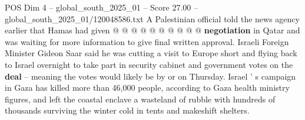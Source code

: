 \begin{textsample}{POS Dim 4 – global\_south\_2025\_01 – Score 27.00 – global\_south\_2025\_01/120048586.txt}
A Palestinian official told the news agency earlier that Hamas had given @ @ @ @ @ @ @ @ @ @ \textbf{negotiation} in Qatar and was waiting for more information to give final written approval.
Israeli Foreign Minister Gideon Saar said he was cutting a visit to Europe short and flying back to Israel overnight to take part in security cabinet and government votes on the \textbf{deal} -- meaning the votes would likely be by or on Thursday.
Israel ' s campaign in Gaza has killed more than 46,000 people, according to Gaza health ministry figures, and left the coastal enclave a wasteland of rubble with hundreds of thousands surviving the winter cold in tents and makeshift shelters.

\end{textsample}
